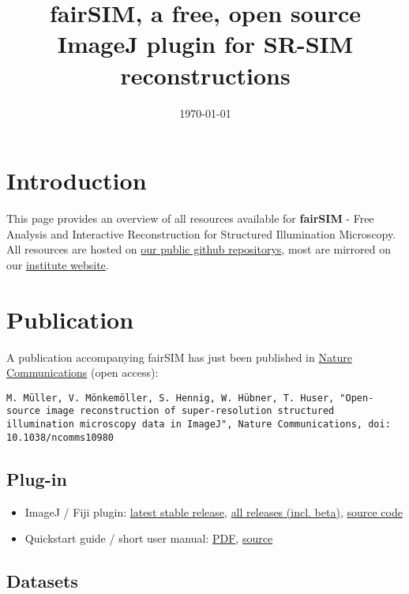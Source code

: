 \documentclass[twoside=false,
           a4paper,
           10pt,DIV=16,parindent=none,parskip=half]{article}
\title{fairSIM, a free, open source ImageJ plugin for SR-SIM reconstructions}
\date{\small \today}
\begin{document}
\maketitle


\section*{Introduction}
This page provides an overview of all resources available
for \textbf{fairSIM}  - Free Analysis and Interactive Reconstruction for Structured Illumination Microscopy.
\\
All resources are hosted on \href{https://github.com/fairSIM}{our public github repositorys},
most are mirrored on our \href{http://www.physik.uni-bielefeld.de/fairsim}{institute website}.

\section*{Publication}

A publication accompanying fairSIM has just been published in
\href{http://www.nature.com/ncomms/2016/160321/ncomms10980/abs/ncomms10980.html}{Nature Communications} (open access):

\texttt{M. Müller, V. Mönkemöller, S. Hennig, W. Hübner, T. Huser, 
"Open-source image reconstruction of super-resolution structured illumination
microscopy data in ImageJ", Nature Communications, doi: 10.1038/ncomms10980}


\subsection*{Plug-in}
\begin{itemize}
\item 
ImageJ / Fiji plugin:
\href{https://github.com/fairSIM/fairSIM/releases/latest}{latest stable release},
\href{https://github.com/fairSIM/fairSIM/releases/}{all releases (incl. beta)},
\href{https://github.com/fairSIM/fairSIM/}{source code}
\item
Quickstart guide / short user manual:
\href{https://github.com/fairSIM/documentation/releases/latest}{PDF},
\href{https://github.com/fairSIM/documentation}{source}
\end{itemize}


\subsection*{Datasets}
\end{document}
